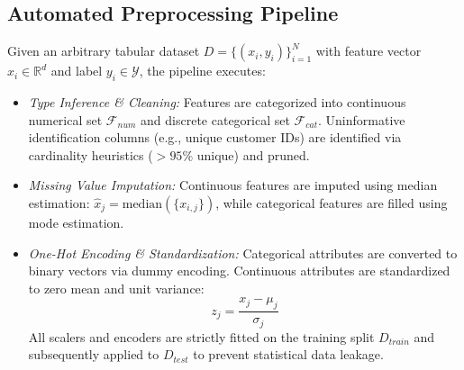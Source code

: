 \documentclass[conference]{IEEEtran}
\begin{document}
\subsection{Automated Preprocessing Pipeline}
Given an arbitrary tabular dataset $D = \{(x_i, y_i)\}_{i=1}^N$ with feature vector $x_i \in \mathbb{R}^d$ and label $y_i \in \mathcal{Y}$, the pipeline executes:
\begin{itemize}
    \item \textit{Type Inference \& Cleaning:} Features are categorized into continuous numerical set $\mathcal{F}_{num}$ and discrete categorical set $\mathcal{F}_{cat}$. Uninformative identification columns (e.g., unique customer IDs) are identified via cardinality heuristics ($>95\%$ unique) and pruned.
    \item \textit{Missing Value Imputation:} Continuous features are imputed using median estimation: $\hat{x}_{j} = \text{median}(\{x_{i,j}\})$, while categorical features are filled using mode estimation.
    \item \textit{One-Hot Encoding \& Standardization:} Categorical attributes are converted to binary vectors via dummy encoding. Continuous attributes are standardized to zero mean and unit variance:
    \begin{equation}
        z_j = \frac{x_j - \mu_j}{\sigma_j}
    \end{equation}
    All scalers and encoders are strictly fitted on the training split $D_{train}$ and subsequently applied to $D_{test}$ to prevent statistical data leakage.
\end{itemize}
\end{document}
